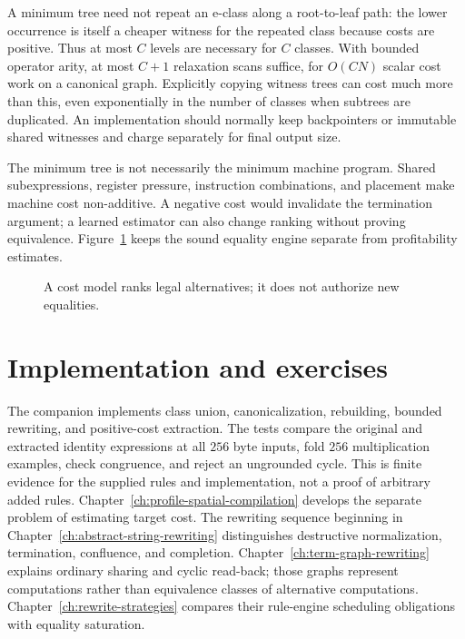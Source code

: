 A minimum tree need not repeat an e-class along a root-to-leaf path: the lower occurrence is itself a cheaper witness for the repeated class because costs are positive.
Thus at most $C$ levels are necessary for $C$ classes.
With bounded operator arity, at most $C+1$ relaxation scans suffice, for $O(CN)$ scalar cost work on a canonical graph.
Explicitly copying witness trees can cost much more than this, even exponentially in the number of classes when subtrees are duplicated.
An implementation should normally keep backpointers or immutable shared witnesses and charge separately for final output size.

The minimum tree is not necessarily the minimum machine program.
Shared subexpressions, register pressure, instruction combinations, and placement make machine cost non-additive.
A negative cost would invalidate the termination argument; a learned estimator can also change ranking without proving equivalence.
Figure~\ref{fig:ch62-gates} keeps the sound equality engine separate from profitability estimates.

\begin{figure}[htbp]
\centering
{}
\caption{A cost model ranks legal alternatives; it does not authorize new equalities.}
\label{fig:ch62-gates}
\end{figure}

\section{Implementation and exercises}
\label{sec:ch62-exercises}

The  companion implements class union, canonicalization, rebuilding, bounded rewriting, and positive-cost extraction.
The tests compare the original and extracted identity expressions at all $256$ byte inputs, fold $256$ multiplication examples, check congruence, and reject an ungrounded cycle.
This is finite evidence for the supplied rules and implementation, not a proof of arbitrary added rules.
Chapter~\ref{ch:profile-spatial-compilation} develops the separate problem of estimating target cost.
The rewriting sequence beginning in Chapter~\ref{ch:abstract-string-rewriting} distinguishes destructive normalization, termination, confluence, and completion.
Chapter~\ref{ch:term-graph-rewriting} explains ordinary sharing and cyclic read-back; those graphs represent computations rather than equivalence classes of alternative computations.
Chapter~\ref{ch:rewrite-strategies} compares their rule-engine scheduling obligations with equality saturation.

